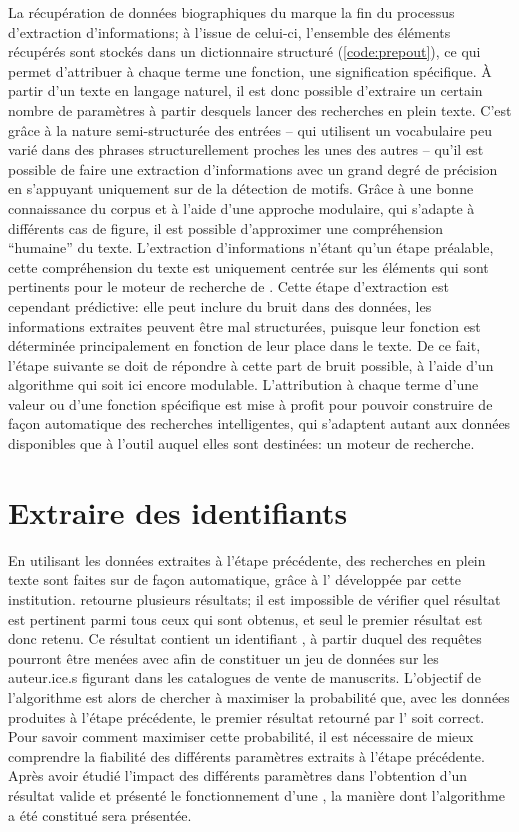 La récupération de données biographiques du \ttrait{} marque la fin du processus d'extraction d'informations; à l'issue de celui-ci, l'ensemble des éléments récupérés sont stockés dans un \gls{dictionnaire} structuré (\ref{code:prepout}), ce qui permet d'attribuer à chaque terme une fonction, une signification spécifique. À partir d'un texte en langage naturel, il est donc possible d'extraire un certain nombre de paramètres à partir desquels lancer des recherches en plein texte. C'est grâce à la nature semi-structurée des entrées -- qui utilisent un vocabulaire peu varié dans des phrases structurellement proches les unes des autres -- qu'il est possible de faire une extraction d'informations avec un grand degré de précision en s'appuyant uniquement sur de la détection de motifs. Grâce à une bonne connaissance du corpus et à l'aide d'une approche modulaire, qui s'adapte à différents cas de figure, il est possible d'approximer une compréhension \enquote{humaine} du texte. L'extraction d'informations n'étant qu'un étape préalable, cette compréhension du texte est uniquement centrée sur les éléments qui sont pertinents pour le moteur de recherche de \wkd{}. Cette étape d'extraction est cependant prédictive: elle peut inclure du bruit dans des données, les informations extraites peuvent être mal structurées, puisque leur fonction est déterminée principalement en fonction de leur place dans le texte. De ce fait, l'étape suivante se doit de répondre à cette part de bruit possible, à l'aide d'un algorithme qui soit ici encore modulable. L'attribution à chaque terme d'une valeur ou d'une fonction spécifique est mise à profit pour pouvoir construire de façon automatique des recherches intelligentes, qui s'adaptent autant aux données disponibles que à l'outil auquel elles sont destinées: un moteur de recherche.


\section{Extraire des identifiants \wkd{}}
En utilisant les données extraites à l'étape précédente, des recherches en plein texte sont faites sur \wkd{} de façon automatique, grâce à l'\api{} développée par cette institution. \wkd{} retourne plusieurs résultats; il est impossible de vérifier quel résultat est pertinent parmi tous ceux qui sont obtenus, et seul le premier résultat est donc retenu. Ce résultat contient un identifiant \wkd{}, à partir duquel des requêtes pourront être menées avec \sparql{} afin de constituer un jeu de données sur les auteur.ice.s figurant dans les catalogues de vente de manuscrits. L'objectif de l'algorithme est alors de chercher à maximiser la probabilité que, avec les données produites à l'étape précédente, le premier résultat retourné par l'\api{} soit correct. Pour savoir comment maximiser cette probabilité, il est nécessaire de mieux comprendre la fiabilité des différents paramètres extraits à l'étape précédente. Après avoir étudié l'impact des différents paramètres dans l'obtention d'un résultat valide et présenté le fonctionnement d'une \api{}, la manière dont l'algorithme a été constitué sera présentée.

